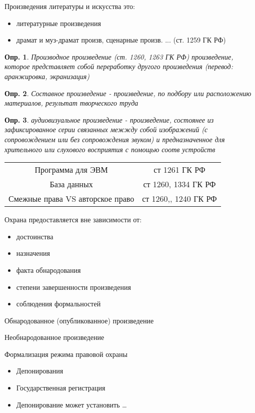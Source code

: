 \documentclass[12pt]{article}
\newtheorem{definition}{Опр.}
\begin{document}
Произведения литературы и искусства это:
\begin{itemize}
\item литературные произведения
\item драмат и муз-драмат произв, сценарные произв.
... (ст. 1259 ГК РФ)
\end{itemize}

\begin{definition}
Производное произведение (ст. 1260, 1263 ГК РФ)
произведение, которое представляет собой переработку другого произведения (перевод: аранжировка, экранизация)
\end{definition}

\begin{definition}
Составное произведение - произведение, по подбору или расположению материалов, результат творческого труда
\end{definition}
\begin{definition}
аудиовизуальное произведение - произведение, состоянее из зафиксированное серии связанных межжду собой изображений 
(с сопровождением или без сопровождения звуком) и предназначенное для хрительного или слухового восприятия с
помощью соотв устройств
\end{definition}

\begin{tabular}{ c c }
Программа для ЭВМ & ст 1261 ГК РФ \\ 
База данных  & ст 1260, 1334 ГК РФ\\  
Смежные права VS авторское право &  ст 1260,, 1240 ГК РФ    
\end{tabular}


Охрана предоставляется вне зависимости от:
\begin{itemize}
\item достоинства
\item назначения
\item факта обнародования
\item степени завершенности произведения
\item соблюдения формальностей
\end{itemize}

Обнародованное (опубликованное) произведение

Необнародованное произведение

Формализация режима правовой охраны
\begin{itemize}
\item Депонирования
\item Государственная регистрация
\item Депонирование может установить \dots
\end{itemize}
\end{document}
